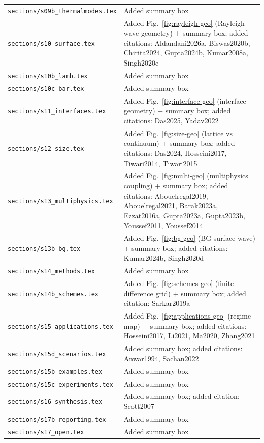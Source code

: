 \documentclass[12pt,a4paper]{article}
\begin{document}
\begin{tabularx}{\textwidth}{@{}lX@{}}
{\tt sections/s09b\_thermalmodes.tex} & Added summary box\\
{\tt sections/s10\_surface.tex} & Added Fig.~\ref*{fig:rayleigh-geo} (Rayleigh-wave geometry) + summary box; added citations: Aldandani2026a, Biswas2020b, Chirita2024, Gupta2024b, Kumar2008a, Singh2020e\\
{\tt sections/s10b\_lamb.tex} & Added summary box\\
{\tt sections/s10c\_bar.tex} & Added summary box\\
{\tt sections/s11\_interfaces.tex} & Added Fig.~\ref*{fig:interface-geo} (interface geometry) + summary box; added citations: Das2025, Yadav2022\\
{\tt sections/s12\_size.tex} & Added Fig.~\ref*{fig:size-geo} (lattice vs continuum) + summary box; added citations: Das2024, Hosseini2017, Tiwari2014, Tiwari2015\\
{\tt sections/s13\_multiphysics.tex} & Added Fig.~\ref*{fig:multi-geo} (multiphysics coupling) + summary box; added citations: Abouelregal2019, Abouelregal2021, Barak2023a, Ezzat2016a, Gupta2023a, Gupta2023b, Youssef2011, Youssef2014\\
{\tt sections/s13b\_bg.tex} & Added Fig.~\ref*{fig:bg-geo} (BG surface wave) + summary box; added citations: Kumar2024b, Singh2020d\\
{\tt sections/s14\_methods.tex} & Added summary box\\
{\tt sections/s14b\_schemes.tex} & Added Fig.~\ref*{fig:schemes-geo} (finite-difference grid) + summary box; added citation: Sarkar2019a\\
{\tt sections/s15\_applications.tex} & Added Fig.~\ref*{fig:applications-geo} (regime map) + summary box; added citations: Hosseini2017, Li2021, Ma2020, Zhang2021\\
{\tt sections/s15d\_scenarios.tex} & Added summary box; added citations: Anwar1994, Sachan2022\\
{\tt sections/s15b\_examples.tex} & Added summary box\\
{\tt sections/s15c\_experiments.tex} & Added summary box\\
{\tt sections/s16\_synthesis.tex} & Added summary box; added citation: Scott2007\\
{\tt sections/s17b\_reporting.tex} & Added summary box\\
{\tt sections/s17\_open.tex} & Added summary box\\
\bottomrule
\end{tabularx}
\end{document}
